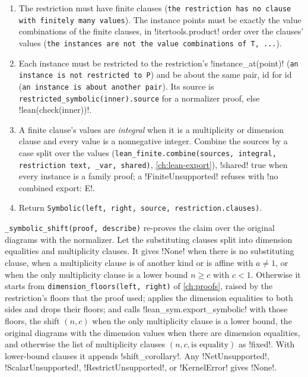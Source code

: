 \begin{algorithm}\label{alg:kernel-finite}
\begin{enumerate}
\item The restriction must have finite clauses (\texttt{the restriction has no clause with finitely many values}). The instance points must be exactly the value combinations of the finite clauses, in \py!itertools.product! order over the clauses' values (\texttt{the instances are not the value combinations of T,\allowbreak{} .\allowbreak{}.\allowbreak{}.\allowbreak{}}).
\item Each instance must be restricted to the restriction's \py!instance_at(point)! (\texttt{an instance is not restricted to P}) and be about the same pair, id for id (\texttt{an instance is about another pair}). Its source is \texttt{restricted\_\allowbreak{}symbolic(\allowbreak{}inner).\allowbreak{}source} for a normalizer proof, else \py!lean(check(inner))!.
\item A finite clause's values are \emph{integral} when it is a multiplicity or dimension clause and every value is a nonnegative integer. Combine the sources by a case split over the values (\texttt{lean\_\allowbreak{}finite.\allowbreak{}combine(\allowbreak{}sources,\allowbreak{} integral,\allowbreak{} restriction text,\allowbreak{} \_\allowbreak{}var,\allowbreak{} shared)}, \cref{ch:lean-export}), \code!shared! true when every instance is a family proof; a \py!FiniteUnsupported! refuses with \code!no combined export: E!.
\item Return \texttt{Symbolic(\allowbreak{}left,\allowbreak{} right,\allowbreak{} source,\allowbreak{} restriction.\allowbreak{}clauses)}.
\end{enumerate}
\end{algorithm}

\texttt{\_\allowbreak{}symbolic\_\allowbreak{}shift(\allowbreak{}proof,\allowbreak{} describe)} re-proves the claim over the original diagrams with the normalizer. Let the substituting clauses split into dimension equalities and multiplicity clauses. It gives \py!None! when there is no substituting clause, when a multiplicity clause is of another kind or is affine with $a\neq1$, or when the only multiplicity clause is a lower bound $n\ge c$ with $c<1$. Otherwise it starts from \texttt{dimension\_\allowbreak{}floors(\allowbreak{}left,\allowbreak{} right)} of \cref{ch:proofs}, raised by the restriction's floors that the proof used; applies the dimension equalities to both sides and drops their floors; and calls \py!lean_sym.export_symbolic! with those floors, the shift $(n,c)$ when the only multiplicity clause is a lower bound, the original diagrams with the dimension values when there are dimension equalities, and otherwise the list of multiplicity clauses $(n, c, \text{is equality})$ as \code!fixed!. With lower-bound clauses it appends \py!shift_corollary!. Any \py!NetUnsupported!, \py!ScalarUnsupported!, \py!RestrictUnsupported!, or \py!KernelError! gives \py!None!.

